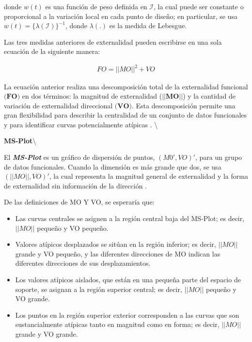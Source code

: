 \documentclass[
]{book}
\begin{document}
donde \(w(t)\) es una función de peso definida en \(\mathcal{I}\), la cual puede ser constante o proporcional a la variación local en cada punto de diseño; en particular, se usa \(w(t)=\{\lambda(\mathcal{I})\}^{-1}\), donde \(\lambda(.)\) es la medida de Lebesgue.

Las tres medidas anteriores de externalidad pueden escribirse en una sola ecuación de la siguiente manera:

\begin{align*}
    FO=||MO||^2 +VO
\end{align*}

La ecuación anterior realiza una descomposición total de la externalidad funcional \(\textbf{(FO)}\) en dos términos: la magnitud de externalidad (\(||\textbf{MO}||\)) y la cantidad de variación de externalidad direccional \(\textbf{(VO)}\). Esta descomposición permite una gran flexibilidad para describir la centralidad de un conjunto de datos funcionales y para identificar curvas potencialmente atípicas \citep{dai}. \textbackslash{}

\textbf{MS-Plot}\textbackslash{}

El \textbf{\textit{MS-Plot}} es un gráfico de dispersión de puntos, \((M0',VO)'\), para un grupo de datos funcionales. Cuando la dimensión es más grande que dos, se usa \((||MO||,VO)'\), la cual representa la magnitud general de externalidad y la forma de externalidad sin información de la dirección \citep{dai}.

De las definiciones de MO Y VO, se esperaría que:

\begin{itemize}
\item
  Las curvas centrales se asignen a la región central baja del MS-Plot; es decir, \(||MO||\) pequeño y VO pequeño.
\item
  Valores atípicos desplazados se sitúan en la región inferior; es decir, \(||MO||\) grande y VO pequeño, y las diferentes direcciones de MO indican las diferentes direcciones de sus desplazamientos.
\item
  Los valores atípicos aislados, que están en una pequeña parte del espacio de soporte, se asignan a la región superior central; es decir, \(||MO||\) pequeño y VO grande.
\item
  Los puntos en la región superior exterior corresponden a las curvas que son sustancialmente atípicas tanto en magnitud como en forma; es decir, \(||MO||\) grande y VO grande.
\end{itemize}
\end{document}

